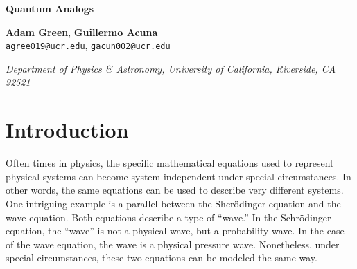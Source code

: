 \documentclass[12pt]{article}
\newcommand{\email}[1]{\href{mailto:#1}{#1}}
\newenvironment{institutions}[1][2em]{\begin{list}{}{\setlength\leftmargin{#1}\setlength\rightmargin{#1}}\item[]}{\end{list}}
\begin{document}
	
\begin{center}

	{\huge \bf Quantum Analogs}
	
	\vspace{0.5cm}
	
	\textbf{Adam Green}, \textbf{Guillermo Acuna}\\
	
	\texttt{\footnotesize \email{agree019@ucr.edu}},
	\texttt{\footnotesize \email{gacun002@ucr.edu}}
	
	\vspace{0.5cm}
	
	
	\begin{institutions}[2.25cm]
		\footnotesize
		{\it 
			Department of Physics \& Astronomy, 
			University of  California, Riverside, 
			{CA} 92521	    
		}    
	\end{institutions}

	\vspace{0.5cm}
	
\end{center}

	\vspace{0.5cm}

\begin{abstract}
	In this experiment, we model the quantum mechanical wavefunction of the Hydrogen atom as a pressure wave inside a spherical cavity. We find that, for a spherically symmetric cavity, the standing pressure waves coincide with the polynomials to a standard error of 0.0360 and polar graphs of acoustic amplitude against polar angle, at a qualitative level, match those of the spherical harmonics. Further, we simulate the Zeeman effect and break the spherical symmetry by elongating the cavity with spacing rings. For the $\ell=1$ state, we are able to resolve the $m=0$ and $m=\pm1$ resonant peaks. Polar graphs of acoustic amplitude for the split peaks correspond to their respective spherical harmonics.
\end{abstract}


\tableofcontents


\section{Introduction}
Often times in physics, the specific mathematical equations used to represent physical systems can become system-independent under special circumstances. In other words, the same equations can be used to describe very different systems. One intriguing example is a parallel between the Shcr\"odinger equation and the wave equation. Both equations describe a type of ``wave.'' In the Schr\"odinger equation, the ``wave'' is not a physical wave, but a probability wave. In the case of the wave equation, the wave is a physical pressure wave. Nonetheless, under special circumstances, these two equations can be modeled the same way.
\end{document}
